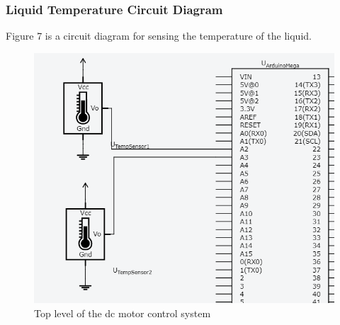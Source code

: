 \documentclass [10pt]{article}
\begin{document}
\pagebreak



\subsubsection{Liquid Temperature Circuit Diagram}
Figure 7 is a circuit diagram for sensing the temperature of the liquid.
\begin{figure} [h!]
	\centering
	\includegraphics [scale = 0.6] {Figures/TempSensor.png}
	\caption{Top level of the dc motor control system}
\end{figure}

\end{document}
